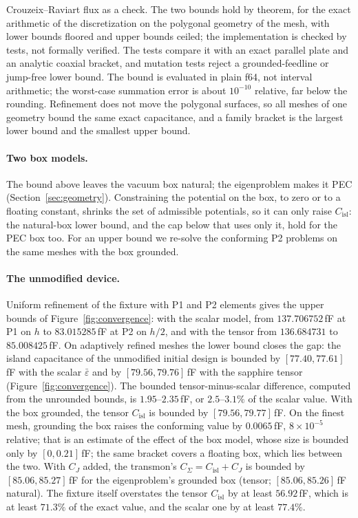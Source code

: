 \documentclass{anvil-paper}
\newcommand{\Cisl}{C_{\mathrm{isl}}}
\begin{document}
Crouzeix--Raviart flux as a check. The two bounds hold by theorem, for the
exact arithmetic of the discretization on the polygonal geometry of the
mesh, with lower bounds floored and upper bounds ceiled; the implementation
is checked by tests, not formally verified. The tests compare it with an
exact parallel plate and an analytic coaxial bracket, and mutation tests
reject a grounded-feedline or jump-free lower bound. The bound is evaluated
in plain f64, not interval arithmetic; the worst-case summation error is about
$10^{-10}$ relative, far below the rounding. Refinement does not move the
polygonal surfaces, so all meshes of one geometry bound the same exact
capacitance, and a family bracket is the largest lower bound and the
smallest upper bound.

\paragraph{Two box models.}
The bound above leaves the vacuum box natural; the eigenproblem makes it
PEC (Section~\ref{sec:geometry}). Constraining the potential on the box,
to zero or to a floating constant, shrinks the set of admissible
potentials, so it can only raise $\Cisl$: the natural-box lower bound, and
the cap below that uses only it, hold for the PEC box too. For an upper
bound we re-solve the conforming P2 problems on the same meshes with the
box grounded.

\paragraph{The unmodified device.}
Uniform refinement of the fixture with P1 and P2 elements gives the upper
bounds of Figure~\ref{fig:convergence}: with the scalar model, from
$137.706752$\,fF at P1 on $h$ to $83.015285$\,fF at P2 on $h/2$, and with
the tensor from $136.684731$ to $85.008425$\,fF. On adaptively refined meshes the
lower bound closes the gap: the island capacitance of the unmodified
initial design is bounded by $[77.40, 77.61]$\,fF with the scalar
$\bar\varepsilon$ and by $[79.56, 79.76]$\,fF with the sapphire tensor
(Figure~\ref{fig:convergence}). The bounded tensor-minus-scalar
difference, computed from the unrounded bounds, is $1.95$--$2.35$\,fF, or
$2.5$--$3.1\%$ of the scalar value. With the box grounded, the tensor
$\Cisl$ is bounded by $[79.56, 79.77]$\,fF. On the finest mesh, grounding
the box raises the conforming value by $0.0065$\,fF, $8\times10^{-5}$
relative; that is an estimate of the effect of the box model, whose size is
bounded only by $[0, 0.21]$\,fF; the same bracket covers a floating box,
which lies between the two. With $C_J$ added, the transmon's
$C_\Sigma = \Cisl + C_J$ is bounded by $[85.06, 85.27]$\,fF for the
eigenproblem's grounded box (tensor; $[85.06, 85.26]$\,fF natural). The
fixture itself overstates the tensor $\Cisl$ by at least $56.92$\,fF, which is at least $71.3\%$ of
the exact value, and the scalar one by at least $77.4\%$.
\end{document}
